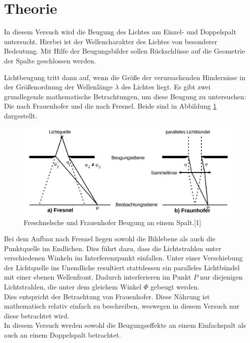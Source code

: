 \section{Theorie}
\label{sec:Theorie}

In diesem Versuch wird die Beugung des Lichtes am Einzel- und Doppelspalt untersucht. Hierbei ist der
Wellencharakter des Lichtes von besonderer Bedeutung. Mit Hilfe der Beugungsbilder sollen Rückschlüsse 
auf die Geometrie der Spalte geschlossen werden. 

Lichtbeugung tritt dann auf, wenn die Größe der verursachenden Hindernisse in der Größenordnung der 
Wellenlänge $\lambda$ des Lichtes liegt. Es gibt zwei grundlegende mathematische Betrachtungen, um diese Beugung
zu untersuchen: Die nach Frauenhofer und die nach Fresnel. Beide sind in Abbildung \ref{fig:Beugungen} 
dargestellt.

\begin{figure}
  \centering
  \includegraphics[scale=0.3]{content/Begungen.jpg}
  \caption{Freschnelsche und Frauenhofer Beugung an einem Spalt.[1]}
  \label{fig:Beugungen}
\end{figure}

Bei dem Aufbau nach Fresnel liegen sowohl die Bildebene als auch die Punktquelle im Endlichen. Dies 
führt dazu, dass die Lichtstrahlen unter verschiedenen Winkeln im Interferenzpunkt einfallen. Unter einer
Verschiebung der Lichtquelle ins Unendliche resultiert stattdessen ein paralleles Lichtbündel mit einer 
ebenen Wellenfront. Dadurch interferieren im Punkt $P$ nur diejenigen Lichtstrahlen, die unter dem gleichem 
Winkel $\Phi$ gebeugt werden. \\
Dies entspricht der Betrachtung von Frauenhofer. Diese Nährung ist mathematisch 
relativ einfach zu beschreiben, weswegen in diesem Versuch nur diese betrachtet wird.\\ 

In diesem Versuch werden sowohl die Beugungseffekte an einem Einfachspalt als auch an einem 
Doppelspalt betrachtet. 

